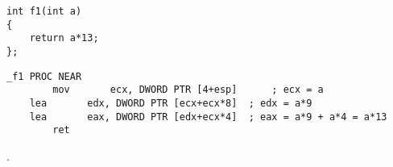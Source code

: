 \begin{lstlisting}
int f1(int a)
{
	return a*13;
};
\end{lstlisting}

\begin{lstlisting}[caption=Intel C++ 2011]
_f1	PROC NEAR 
        mov       ecx, DWORD PTR [4+esp]      ; ecx = a
	lea       edx, DWORD PTR [ecx+ecx*8]  ; edx = a*9
	lea       eax, DWORD PTR [edx+ecx*4]  ; eax = a*9 + a*4 = a*13
        ret                                
\end{lstlisting}

.

